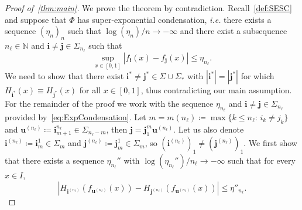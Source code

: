 \documentclass[11pt,]{article}
\def\cref#1{\ref{#1}}%
\theoremstyle{definition}
\theoremstyle{remark}
\renewcommand{\Bbb}[1]{\mathbb{#1}}
\newcommand{\bbN}{{\Bbb N}}         %
\newcommand{\0}{\mathbf{0}}
\newcommand{\bi}{\mathbf{i}}
\newcommand{\bj}{\mathbf{j}}
\newcommand{\bu}{\mathbf{u}}
\begin{document}
\begin{proof}[Proof of~\cref{thm:main}]
We prove the theorem by contradiction. Recall~\cref{def:SESC} and suppose that $\Phi$ has
super-exponential condensation, \emph{i.e.} there exists a sequence $(\eta_n)_n$ such that
$\log(\eta_n)/n\to-\infty$ and there exist a subsequence $n_{\ell}\in\bbN$ and
$\bi\neq\bj\in\Sigma_{n_\ell}$ such that
\begin{equation}\label{eq:ExpCondensation}
  \sup_{x\in[0,1]}|f_{\bi}(x)-f_{\bj}(x)| \leq \eta_{n_\ell}.
\end{equation}
We need to show that there exist $\bi^*\neq\bj^*\in\Sigma\cup\Sigma_*$ with $|\bi^*|=|\bj^*|$ for
which $H_{\bi^*}(x)\equiv
H_{\bj^*}(x)$ for all $x\in[0,1]$, thus contradicting our main assumption. For the remainder of the proof
we work with the sequence $\eta_{n_{\ell}}$ and $\bi\neq\bj\in\Sigma_{n_\ell}$ provided
by~\cref{eq:ExpCondensation}. Let $m=m(n_{\ell})\coloneqq\max\{k\leq n_{\ell}:\, i_k\neq j_k\}$ and
$\bu^{(n_{\ell})}\coloneqq \bi_{m+1}^{n_{\ell}}\in\Sigma_{n_\ell-m}$, then
$\bj=\bj_1^m\bu^{(n_{\ell})}$. Let us also denote $\bi^{(n_{\ell})}\coloneqq\bi_m^1\in\Sigma_m$ and
$\bj^{(n_{\ell})}\coloneqq\bj_m^1\in\Sigma_m$, so $(\bi^{(n_{\ell})})_1\neq (\bj^{(n_{\ell})})_1$.
We first show that there exists a sequence $\eta_{n_{\ell}}''$ with
$\log(\eta_{n_{\ell}}'')/n_{\ell}\to-\infty$ such that for every $x\in I$,
\begin{equation}\label{eq:DiffH_iSUperExp}
|H_{\bi^{(n_\ell)}}(f_{\bu^{(n_\ell)}}(x)) - H_{\bj^{(n_\ell)}}(f_{\bu^{(n_\ell)}}(x))| \leq \eta''_{n_\ell}.
\end{equation}


\end{proof}
\end{document}
